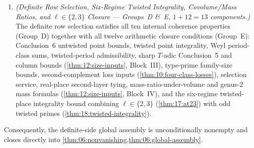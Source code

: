 \begin{theorem}
\begin{enumerate}[label=\textup{\textbf{Definite Theorem~\Roman*.}}]
\item \emph{(Definite Row Selection, Six-Regime Twisted Integrality, Covolume/Mass Ratios, and $\ell \in \{2,3\}$ Closure — Groups~D \&~E, $1 + 12 = 13$ components.)}
  The definite row selection satisfies all ten internal coherence properties (Group~D) together with all twelve arithmetic closure conditions (Group~E): Conclusion~6 untwisted point bounds, twisted point integrality, Weyl period-class sums, twisted-period admissibility, sharp $T$-adic Conclusion~5 and column bounds (\cref{thm:12:size-inputs}, Block~III), type-prime family-size bounds, second-complement loss inputs (\cref{thm:10:four-class-losses}), selection service, real-place second-layer tying, mass-ratio-under-volume and genus-$2$ mass formulas (\cref{thm:12:size-inputs}, Block~IV), and the six-regime twisted-place integrality bound combining $\ell \in \{2, 3\}$ (\cref{thm:17:at23}) with odd twisted primes (\cref{thm:18:twisted-integrality}).
\end{enumerate}
Consequently, the definite-side global assembly is unconditionally nonempty and closes directly into \cref{thm:06:nonvanishing,thm:06:global-assembly}.
\end{theorem}

